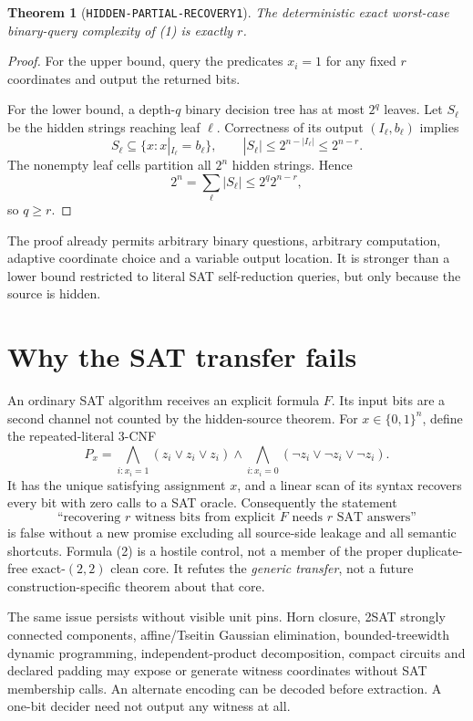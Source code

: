 \documentclass[11pt]{article}
\newtheorem{theorem}{Theorem}
\begin{document}
\begin{theorem}[\texttt{HIDDEN-PARTIAL-RECOVERY1}]
The deterministic exact worst-case binary-query complexity of (1) is exactly $r$.
\end{theorem}

\begin{proof}
For the upper bound, query the predicates $x_i=1$ for any fixed $r$ coordinates and output the returned bits.

For the lower bound, a depth-$q$ binary decision tree has at most $2^q$ leaves.  Let $S_\ell$ be the hidden strings reaching leaf $\ell$.  Correctness of its output $(I_\ell,b_\ell)$ implies
\[
 S_\ell\subseteq\{x:x|_{I_\ell}=b_\ell\},
 \qquad |S_\ell|\le 2^{n-|I_\ell|}\le2^{n-r}.
\]
The nonempty leaf cells partition all $2^n$ hidden strings.  Hence
\[
 2^n=\sum_\ell|S_\ell|\le2^q2^{n-r},
\]
so $q\ge r$.
\end{proof}

The proof already permits arbitrary binary questions, arbitrary computation, adaptive coordinate choice and a variable output location.  It is stronger than a lower bound restricted to literal SAT self-reduction queries, but only because the source is hidden.

\section{Why the SAT transfer fails}

An ordinary SAT algorithm receives an explicit formula $F$.  Its input bits are a second channel not counted by the hidden-source theorem.  For $x\in\{0,1\}^n$, define the repeated-literal 3-CNF
\[
 P_x=\bigwedge_{i:x_i=1}(z_i\vee z_i\vee z_i)
      \wedge
      \bigwedge_{i:x_i=0}(\neg z_i\vee\neg z_i\vee\neg z_i).
 \tag{2}
\]
It has the unique satisfying assignment $x$, and a linear scan of its syntax recovers every bit with zero calls to a SAT oracle.  Consequently the statement
\[
 \text{``recovering $r$ witness bits from explicit $F$ needs $r$ SAT answers''}
 \tag{3}
\]
is false without a new promise excluding all source-side leakage and all semantic shortcuts.  Formula (2) is a hostile control, not a member of the proper duplicate-free exact-$(2,2)$ clean core.  It refutes the \emph{generic transfer}, not a future construction-specific theorem about that core.

The same issue persists without visible unit pins.  Horn closure, 2SAT strongly connected components, affine/Tseitin Gaussian elimination, bounded-treewidth dynamic programming, independent-product decomposition, compact circuits and declared padding may expose or generate witness coordinates without SAT membership calls.  An alternate encoding can be decoded before extraction.  A one-bit decider need not output any witness at all.
\end{document}
